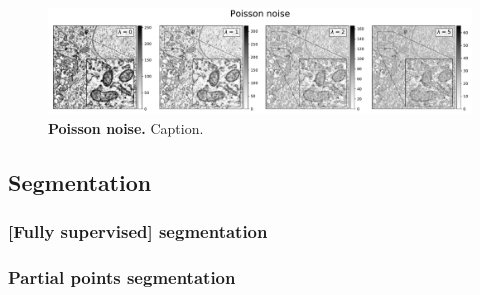 \begin{figure}[!tbh]
    \centering
    \includegraphics[width=\linewidth]{chapter-4/mfigs/mfig_noise.pdf}
    \caption{\textbf{Poisson noise.}
    Caption.}
    \label{fig:4m_noise}
\end{figure}


\subsection{Segmentation}
\label{sec:4methods_segmentation}

\subsubsection{[Fully supervised] segmentation}


\subsubsection{Partial points segmentation}


